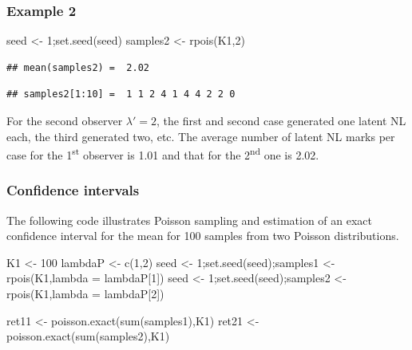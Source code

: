 \documentclass[
]{book}
\newenvironment{Shaded}{\begin{snugshade}}{\end{snugshade}}
\newcommand{\AttributeTok}[1]{\textcolor[rgb]{0.77,0.63,0.00}{#1}}
\newcommand{\DecValTok}[1]{\textcolor[rgb]{0.00,0.00,0.81}{#1}}
\newcommand{\FunctionTok}[1]{\textcolor[rgb]{0.00,0.00,0.00}{#1}}
\newcommand{\NormalTok}[1]{#1}
\newcommand{\OtherTok}[1]{\textcolor[rgb]{0.56,0.35,0.01}{#1}}
\begin{document}
\hypertarget{example-2}{%
\subsubsection{Example 2}\label{example-2}}

\begin{Shaded}
\begin{Highlighting}[]
\NormalTok{seed }\OtherTok{\textless{}{-}} \DecValTok{1}\NormalTok{;}\FunctionTok{set.seed}\NormalTok{(seed)}
\NormalTok{samples2 }\OtherTok{\textless{}{-}} \FunctionTok{rpois}\NormalTok{(K1,}\DecValTok{2}\NormalTok{)}
\end{Highlighting}
\end{Shaded}

\begin{verbatim}
## mean(samples2) =  2.02
\end{verbatim}

\begin{verbatim}
## samples2[1:10] =  1 1 2 4 1 4 4 2 2 0
\end{verbatim}

For the second observer \(\lambda' = 2\), the first and second case generated one latent NL each, the third generated two, etc. The average number of latent NL marks per case for the 1\textsuperscript{st} observer is 1.01 and that for the 2\textsuperscript{nd} one is 2.02.

\hypertarget{confidence-intervals}{%
\subsubsection{Confidence intervals}\label{confidence-intervals}}

The following code illustrates Poisson sampling and estimation of an exact confidence interval for the mean for 100 samples from two Poisson distributions.

\begin{Shaded}
\begin{Highlighting}[]
\NormalTok{K1 }\OtherTok{\textless{}{-}} \DecValTok{100}
\NormalTok{lambdaP }\OtherTok{\textless{}{-}} \FunctionTok{c}\NormalTok{(}\DecValTok{1}\NormalTok{,}\DecValTok{2}\NormalTok{)}
\NormalTok{seed }\OtherTok{\textless{}{-}} \DecValTok{1}\NormalTok{;}\FunctionTok{set.seed}\NormalTok{(seed);samples1 }\OtherTok{\textless{}{-}} \FunctionTok{rpois}\NormalTok{(K1,}\AttributeTok{lambda =}\NormalTok{ lambdaP[}\DecValTok{1}\NormalTok{])}
\NormalTok{seed }\OtherTok{\textless{}{-}} \DecValTok{1}\NormalTok{;}\FunctionTok{set.seed}\NormalTok{(seed);samples2 }\OtherTok{\textless{}{-}} \FunctionTok{rpois}\NormalTok{(K1,}\AttributeTok{lambda =}\NormalTok{ lambdaP[}\DecValTok{2}\NormalTok{])}

\NormalTok{ret11 }\OtherTok{\textless{}{-}} \FunctionTok{poisson.exact}\NormalTok{(}\FunctionTok{sum}\NormalTok{(samples1),K1)}
\NormalTok{ret21 }\OtherTok{\textless{}{-}} \FunctionTok{poisson.exact}\NormalTok{(}\FunctionTok{sum}\NormalTok{(samples2),K1)}
\end{Highlighting}
\end{Shaded}
\end{document}

